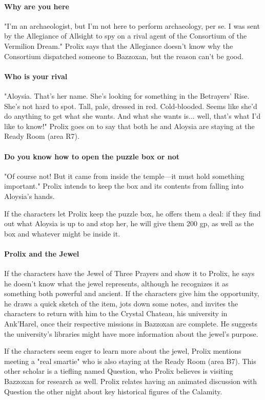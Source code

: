 \documentclass[10pt,a4paper,twoside,twocolumn,openany,nodeprecatedcode]{dndbook}
\begin{document}
\paragraph{Why are you here}
"I'm an archaeologist, but I'm not here to perform archaeology, per se. I was sent by the Allegiance of Allsight to spy on a rival agent of the Consortium of the Vermilion Dream." Prolix says that the Allegiance doesn't know why the Consortium dispatched someone to Bazzoxan, but the reason can't be good.

\paragraph{Who is your rival}
"Aloysia. That's her name. She's looking for something in the Betrayers' Rise. She's not hard to spot. Tall, pale, dressed in red. Cold-blooded. Seems like she'd do anything to get what she wants. And what she wants is... well, that's what I'd like to know!" Prolix goes on to say that both he and Aloysia are staying at the Ready Room (area R7).

\paragraph{Do you know how to open the puzzle box or not}
"Of course not! But it came from inside the temple—it must hold something important." Prolix intends to keep the box and its contents from falling into Aloysia's hands.

If the characters let Prolix keep the puzzle box, he offers them a deal: if they find out what Aloysia is up to and stop her, he will give them 200 gp, as well as the box and whatever might be inside it.

\paragraph{Prolix and the Jewel}
If the characters have the Jewel of Three Prayers and show it to Prolix, he says he doesn't know what the jewel represents, although he recognizes it as something both powerful and ancient. If the characters give him the opportunity, he draws a quick sketch of the item, jots down some notes, and invites the characters to return with him to the Crystal Chateau, his university in Ank'Harel, once their respective missions in Bazzoxan are complete. He suggests the university's libraries might have more information about the jewel's purpose.

If the characters seem eager to learn more about the jewel, Prolix mentions meeting a "real smartie" who is also staying at the Ready Room (area B7). This other scholar is a tiefling named Question, who Prolix believes is visiting Bazzoxan for research as well. Prolix relates having an animated discussion with Question the other night about key historical figures of the Calamity.
\end{document}
